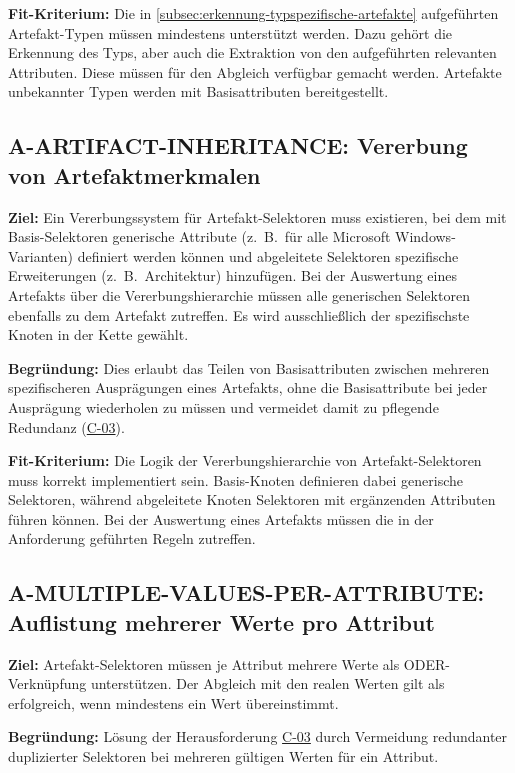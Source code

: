 \textbf{Fit-Kriterium:}
Die in \autoref{subsec:erkennung-typspezifische-artefakte} aufgeführten Artefakt-Typen müssen mindestens unterstützt werden.
Dazu gehört die Erkennung des Typs, aber auch die Extraktion von den aufgeführten relevanten Attributen.
Diese müssen für den Abgleich verfügbar gemacht werden.
Artefakte unbekannter Typen werden mit Basisattributen bereitgestellt.

\subsection{A-ARTIFACT-INHERITANCE: Vererbung von Artefaktmerkmalen}\label{subsec:req-selektor-inheritance}

\textbf{Ziel:}
Ein Vererbungssystem für Artefakt-Selektoren muss existieren, bei dem mit Basis-Selektoren generische Attribute (z.\ B.\ für alle Microsoft Windows-Varianten) definiert werden können und abgeleitete Selektoren spezifische Erweiterungen (z.\ B.\ Architektur) hinzufügen.
Bei der Auswertung eines Artefakts über die Vererbungshierarchie müssen alle generischen Selektoren ebenfalls zu dem Artefakt zutreffen.
Es wird ausschließlich der spezifischste Knoten in der Kette gewählt.

\textbf{Begründung:}
Dies erlaubt das Teilen von Basisattributen zwischen mehreren spezifischeren Ausprägungen eines Artefakts, ohne die Basisattribute bei jeder Ausprägung wiederholen zu müssen und vermeidet damit zu pflegende Redundanz (\hyperref[subsec:c-03-duplizierte-artefakt-selektoren]{C-03}).

\textbf{Fit-Kriterium:}
Die Logik der Vererbungshierarchie von Artefakt-Selektoren muss korrekt implementiert sein.
Basis-Knoten definieren dabei generische Selektoren, während abgeleitete Knoten Selektoren mit ergänzenden Attributen führen können.
Bei der Auswertung eines Artefakts müssen die in der Anforderung geführten Regeln zutreffen.

\subsection{A-MULTIPLE-VALUES-PER-ATTRIBUTE: Auflistung mehrerer Werte pro Attribut}\label{subsec:req-multiple-attribute-values}

\textbf{Ziel:}
Artefakt-Selektoren müssen je Attribut mehrere Werte als ODER-Verknüpfung unterstützen.
Der Abgleich mit den realen Werten gilt als erfolgreich, wenn mindestens ein Wert übereinstimmt.

\textbf{Begründung:}
Lösung der Herausforderung \hyperref[subsec:c-03-duplizierte-artefakt-selektoren]{C-03} durch Vermeidung redundanter duplizierter Selektoren bei mehreren gültigen Werten für ein Attribut.

